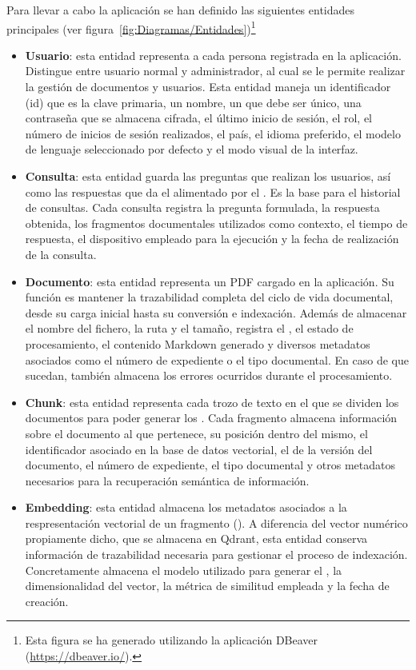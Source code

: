 Para llevar a cabo la aplicación se han definido las siguientes entidades principales (ver figura~\ref{fig:Diagramas/Entidades})\footnote{Esta figura se ha generado utilizando la aplicación DBeaver (\href{https://dbeaver.io/}{https://dbeaver.io/}).}
\begin{itemize}
	\item \textbf{Usuario}: esta entidad representa a cada persona registrada en la aplicación. Distingue entre usuario normal y administrador, al cual se le permite realizar la gestión de documentos y usuarios. Esta entidad maneja un identificador (id) que es la clave primaria, un nombre, un  que debe ser único, una contraseña que se almacena cifrada, el último inicio de sesión, el rol, el número de inicios de sesión realizados, el país, el idioma preferido, el modelo de lenguaje seleccionado por defecto y el modo visual de la interfaz.
	\item \textbf{Consulta}: esta entidad guarda las preguntas que realizan los usuarios, así como las respuestas que da el  alimentado por el . Es la base para el historial de consultas. Cada consulta registra la pregunta formulada, la respuesta obtenida, los fragmentos documentales utilizados como contexto, el tiempo de respuesta, el dispositivo empleado para la ejecución y la fecha de realización de la consulta.
	\item \textbf{Documento}: esta entidad representa un PDF cargado en la aplicación. Su función es mantener la trazabilidad completa del ciclo de vida documental, desde su carga inicial hasta su conversión e indexación. Además de almacenar el nombre del fichero, la ruta y el tamaño, registra el , el estado de procesamiento, el contenido Markdown generado y diversos metadatos asociados como el número de expediente o el tipo documental. En caso de que sucedan, también almacena los errores ocurridos durante el procesamiento. 
	\item \textbf{Chunk}: esta entidad representa cada trozo de texto en el que se dividen los documentos para poder generar los . Cada fragmento almacena información sobre el documento al que pertenece, su posición dentro del mismo, el identificador asociado en la base de datos vectorial, el  de la versión del documento, el número de expediente, el tipo documental y otros metadatos necesarios para la recuperación semántica de información.
	\item \textbf{Embedding}: esta entidad almacena los metadatos asociados a la respresentación vectorial de un fragmento (). A diferencia del vector numérico propiamente dicho, que se almacena en Qdrant, esta entidad conserva información de trazabilidad necesaria para gestionar el proceso de indexación. Concretamente almacena el modelo utilizado para generar el , la dimensionalidad del vector, la métrica de similitud empleada y la fecha de creación.

\end{itemize}

